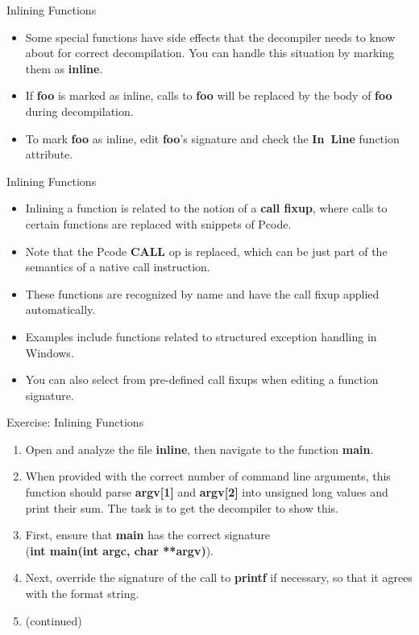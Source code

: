 \documentclass{beamer}
\begin{document}
\begin{frame}
\begin{block}{Inlining Functions}
\begin{itemize}
\item Some special functions have side effects that the decompiler needs to know about for correct decompilation. You can handle this situation by marking them
as \textbf{inline}. 
\item If \textbf{foo} is marked as inline, calls to \textbf{foo} will be replaced by the body of \textbf{foo} during decompilation.
\item To mark \textbf{foo} as inline, edit \textbf{foo}'s signature and check the \textbf{In~Line} function attribute.
\end{itemize}
\end{block}
\end{frame}

\begin{frame}
\begin{block}{Inlining Functions}
\begin{itemize}
\item Inlining a function is related to the notion of a \textbf{call fixup}, where calls to certain functions are replaced with snippets of Pcode.  
\item Note that the Pcode \textbf{CALL} op is replaced, which can be just part of the semantics of a native call instruction.
\item These functions are recognized by name and have the call fixup applied automatically. 
\item Examples include functions related to structured exception handling in Windows.
\item You can also select from pre-defined call fixups when editing a function signature.
\end{itemize}
\end{block}
\end{frame}

\begin{frame}
\begin{block}{Exercise: Inlining Functions}
\begin{enumerate}
\item Open and analyze the file \textbf{inline}, then navigate to the function \textbf{main}.
\item When provided with the correct number of command line arguments, this function should parse \textbf{argv[1]} and \textbf{argv[2]} into unsigned long values and print their sum.
The task is to get the decompiler to show this.
\item First, ensure that \textbf{main} has the correct signature \\ (\textbf{int main(int argc, char **argv)}).
\item Next, override the signature of the call to \textbf{printf} if necessary, so that it agrees with the format string.
\item[] (continued) 
\end{enumerate}
\end{block}
\end{frame}
\end{document}
